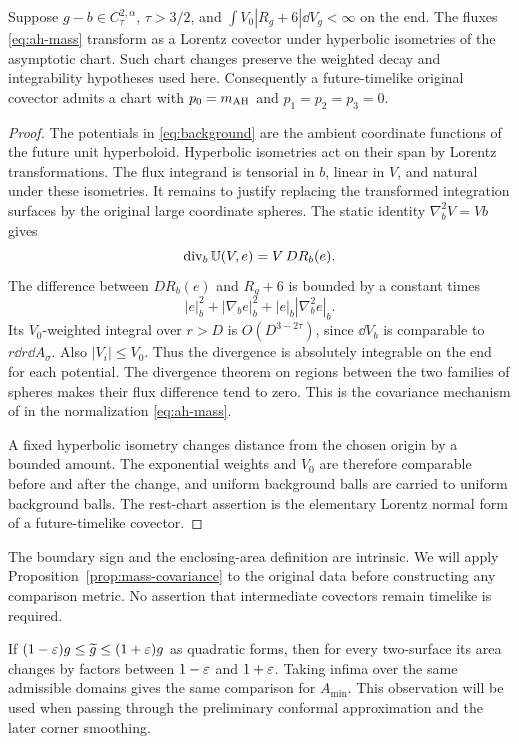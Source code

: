 \begin{proposition}\label{prop:mass-covariance}
Suppose $g-b\in C^{2,\alpha}_\tau$, $\tau>3/2$, and
$\int V_0|R_g+6|\dd V_g<\infty$ on the end. The fluxes
\eqref{eq:ah-mass} transform as a Lorentz covector under hyperbolic
isometries of the asymptotic chart. Such chart changes preserve the
weighted decay and integrability hypotheses used here. Consequently
a future-timelike original covector admits a chart with
$p_0=m_{\mathrm{AH}}$ and $p_1=p_2=p_3=0$.
\end{proposition}
\begin{proof}
The potentials in \eqref{eq:background} are the ambient coordinate
functions of the future unit hyperboloid. Hyperbolic isometries act on
their span by Lorentz transformations. The flux integrand is tensorial
in $b$, linear in $V$, and natural under these isometries.
It remains to justify replacing the transformed integration surfaces
by the original large coordinate spheres. The static identity
$\nabla_b^2V=Vb$ gives
\[
 \operatorname{div}_b\mathbb U(V,e)=V\,D R_b(e).
\]
The difference between $D R_b(e)$ and $R_g+6$ is bounded by a constant
times
\[
 |e|_b^2+|\nabla_be|_b^2+|e|_b|\nabla_b^2e|_b.
\]
Its $V_0$-weighted integral over $r>D$ is
$O(D^{3-2\tau})$, since $\dd V_b$ is comparable to
$r\dd r\dd A_\sigma$. Also $|V_i|\le V_0$.
Thus the divergence is absolutely integrable on the end for each
potential. The divergence theorem on regions between the two
families of spheres makes their flux difference tend to zero.
This is the covariance mechanism of
\citet[Proposition 2.2, Theorem 2.3, and Section 3]{CH2003} in the
normalization \eqref{eq:ah-mass}.

A fixed hyperbolic isometry changes distance from the chosen origin
by a bounded amount. The exponential weights and $V_0$ are therefore
comparable before and after the change, and uniform background balls
are carried to uniform background balls. The rest-chart assertion is
the elementary Lorentz normal form of a future-timelike covector.
\end{proof}

The boundary sign and the enclosing-area definition are intrinsic.
We will apply Proposition~\ref{prop:mass-covariance} to the original
data before constructing any comparison metric. No assertion that
intermediate covectors remain timelike is required.

If $(1-\varepsilon)g\le\widetilde g\le(1+\varepsilon)g$ as quadratic forms,
then for every two-surface its area changes by factors between
$1-\varepsilon$ and $1+\varepsilon$. Taking infima over the same admissible domains
gives the same comparison for $A_{\min}$. This observation will be
used when passing through the preliminary conformal approximation
and the later corner smoothing.

